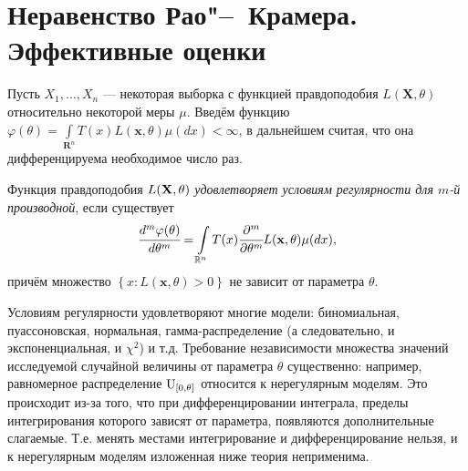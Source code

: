 \section{Неравенство Рао"--~Крамера. Эффективные оценки}
Пусть $X_1, \ldots, X_n$  —  некоторая выборка с функцией правдоподобия $L(\mathbf{X}, \theta)$ относительно некоторой меры $\mu$. Введём функцию ${\varphi(\theta)=\int\limits_{\mathbf{R}^{n}} T(x) L(\mathbf{x}, \theta) \mu(d x)<\infty}$, в дальнейшем считая, что она дифференцируема необходимое число раз.

\begin{defn}
    Функция правдоподобия $L(\mathbf{X}, \theta)$ \textit{удовлетворяет условиям регулярности для $m$-й производной}, если существует
    \begin{equation*}
        \cfrac{d^{m} \varphi(\theta)}{d \theta^{m}}=\int\limits_{\mathbb{R}^{n}} T(x) \cfrac{\partial^{m}}{\partial \theta^{m}}L(\mathbf{x}, \theta) \mu(d x),
    \end{equation*}
    причём множество $\left\{ {x\colon L(\mathbf{x},\theta) > 0} \right\}$ не зависит от параметра $\theta$.
\end{defn}

\begin{exmp}
    Условиям регулярности удовлетворяют многие модели: биномиальная, пуассоновская, нормальная, гамма-распределение (а следовательно, и экспоненциальная, и $\chi^2$) и т.д.
    Требование независимости множества значений исследуемой случайной величины от параметра $\theta$ существенно: например, равномерное распределение $\operatorname{\mathrm{U}}_{[0, \theta]}$ относится к нерегулярным моделям.
    Это происходит из-за того, что при дифференцировании интеграла, пределы интегрирования которого зависят от параметра, появляются дополнительные слагаемые. 
    Т.е. менять местами интегрирование и дифференцирование нельзя, и к нерегулярным моделям изложенная ниже теория неприменима.
\end{exmp}

